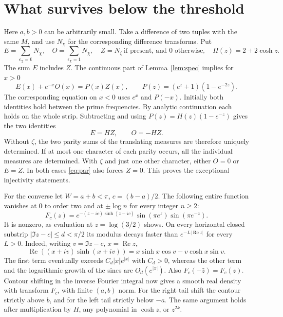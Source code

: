 \documentclass[11pt]{article}
\newcommand{\Real}{\operatorname{Re}}
\begin{document}
\section{What survives below the threshold}\label{sec:below}
Here \(a,b>0\) can be arbitrarily small. Take a difference of two tuples with the same \(M\), and use \(N_\chi\) for the corresponding difference transforms. Put
\[
 E=\sum_{\epsilon_\chi=0}N_\chi,\quad
 O=\sum_{\epsilon_\chi=1}N_\chi,\quad
 Z=N_\zeta\ \text{if present, and }0\text{ otherwise},\quad H(z)=2+2\cosh z.
\]
The sum \(E\) includes \(Z\). The continuous part of Lemma~\ref{lem:spec} implies for \(x>0\)
\[
 E(x)+e^{-x}O(x)=P(x)Z(x),\qquad
 P(z)=(e^z+1)(1-e^{-2z}).
\]
The corresponding equation on \(x<0\) uses \(e^x\) and \(P(-x)\).
Initially both identities hold between the prime frequencies. By analytic continuation each holds on the whole strip. Subtracting and using
\(P(z)=H(z)(1-e^{-z})\) gives the two identities
\begin{equation}\label{eq:par}
                    E=HZ,\qquad O=-HZ .
\end{equation}
Without \(\zeta\), the two parity sums of the translating measures are therefore uniquely determined. If at most one character of each parity occurs, all the individual measures are determined. With \(\zeta\) and just one other character, either \(O=0\) or \(E=Z\). In both cases \eqref{eq:par} also forces \(Z=0\). This proves the exceptional injectivity statements.

For the converse let \(W=a+b<\pi\), \(c=(b-a)/2\). The following entire function vanishes at \(0\) to order two and at \(\pm\log n\) for every integer \(n\ge2\):
\begin{equation}\label{eq:F}
 F_c(z)=e^{-(z-ic)\sinh(z-ic)}\sin(\pi e^z)\sin(\pi e^{-z}).
\end{equation}
It is nonzero, as evaluation at \(z=\log(3/2)\) shows. On every horizontal closed substrip \(|\Im z-c|\le d<\pi/2\) its modulus decays faster than \(e^{-L|\Real z|}\) for every \(L>0\). Indeed, writing \(v=\Im z-c\), \(x=\Real z\),
\[
 \Real((x+iv)\sinh(x+iv))=x\sinh x\cos v-v\cosh x\sin v .
\]
The first term eventually exceeds \(C_d|x|e^{|x|}\) with \(C_d>0\), whereas the other term and the logarithmic growth of the sines are \(O_d(e^{|x|})\). Also \(F_c(-\bar z)=\overline{F_c(z)}\).
Contour shifting in the inverse Fourier integral now gives a smooth real density with transform \(F_c\), with finite \((a,b)\) norm. For the right tail shift the contour strictly above \(b\), and for the left tail strictly below \(-a\). The same argument holds after multiplication by \(H\), any polynomial in \(\cosh z\), or \(z^{2k}\).
\end{document}
